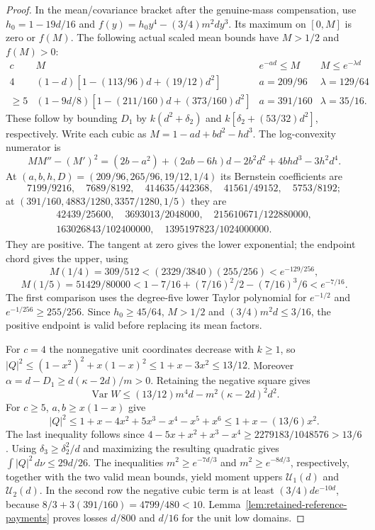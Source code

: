 \begin{proof}
In the mean/covariance bracket after the genuine-mass compensation,
use $h_0=1-19d/16$ and
$f(y)=h_0y^4-(3/4)m^2dy^3$.
Its maximum on $[0,M]$ is zero or $f(M)$.
The following actual scaled mean bounds have $M>1/2$ and $f(M)>0$:
\[
\begin{array}{c|c|cc}
 c&M&e^{-a d}\le M&M\le e^{-\lambda d}\\\hline
 4&(1-d)[1-(113/96)d+(19/12)d^2]&a=209/96&\lambda=129/64\\
 \ge5&(1-9d/8)[1-(211/160)d+(373/160)d^2]&a=391/160&\lambda=35/16.
\end{array}
\]
These follow by bounding $D_1$ by $k(d^2+\delta_2)$ and
$k[\delta_2+(53/32)d^2]$, respectively.
Write each cubic as $M=1-ad+bd^2-hd^3$.
The log-convexity numerator is
\[
 MM''-(M')^2=(2b-a^2)+(2ab-6h)d-2b^2d^2+4bhd^3-3h^2d^4.
\]
At $(a,b,h,D)=(209/96,265/96,19/12,1/4)$ its Bernstein
coefficients are
\[
 7199/9216,\quad7689/8192,\quad414635/442368,
 \quad41561/49152,\quad5753/8192;
\]
at $(391/160,4883/1280,3357/1280,1/5)$ they are
\[
\begin{gathered}
 42439/25600,\quad3693013/2048000,\quad215610671/122880000,\\
 163026843/102400000,\quad1395197823/1024000000.
\end{gathered}
\]
They are positive. The tangent at zero gives the lower exponential;
the endpoint chord gives the upper, using
\[
 M(1/4)=309/512<(2329/3840)(255/256)<e^{-129/256},
\]
\[
 M(1/5)=51429/80000<1-7/16+(7/16)^2/2-(7/16)^3/6<e^{-7/16}.
\]
The first comparison uses the degree-five lower Taylor polynomial
for $e^{-1/2}$ and $e^{-1/256}\ge255/256$.
Since $h_0\ge45/64$, $M>1/2$ and $(3/4)m^2d\le3/16$,
the positive endpoint is valid before replacing its mean factors.

For $c=4$ the nonnegative unit coordinates decrease with
$k\ge1$, so
$|Q|^2\le(1-x^2)^2+x(1-x)^2\le1+x-3x^2\le13/12$.
Moreover
$\alpha=d-D_1\ge d(\kappa-2d)/m>0$. Retaining the negative square gives
\[
 \operatorname{Var}W\le(13/12)m^4d-m^2(\kappa-2d)^2d^2.
\]
For $c\ge5$, $a,b\ge x(1-x)$ give
\[
 |Q|^2\le1+x-4x^2+5x^3-x^4-x^5+x^6
       \le1+x-(13/6)x^2.
\]
The last inequality follows since
$4-5x+x^2+x^3-x^4\ge2279183/1048576>13/6$.
Using $\delta_3\ge\delta_2^2/d$ and maximizing the resulting quadratic
gives $\int|Q|^2\,d\nu\le29d/26$.
The inequalities $m^2\ge e^{-7d/3}$ and $m^2\ge e^{-8d/3}$,
respectively, together with the two valid mean bounds, yield moment
uppers $\mathcal U_1(d)$ and $\mathcal U_2(d)$.
In the second row the negative cubic term is at least
$(3/4)d e^{-10d}$, because $8/3+3(391/160)=4799/480<10$.
Lemma~\ref{lem:retained-reference-payments} proves losses $d/800$
and $d/16$ for the unit low domains.


\end{proof}
